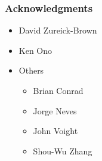 \documentclass{beamer}
\theoremstyle{remark}
\begin{document}

\begin{frame}
\frametitle{Acknowledgments}
\begin{itemize}
	\item David Zureick-Brown
	\item Ken Ono
	\item Others
	\begin{itemize}
		\item Brian Conrad
		\item Jorge Neves
		\item John Voight
		\item Shou-Wu Zhang
	\end{itemize}
\end{itemize}
\end{frame}
\end{document}

